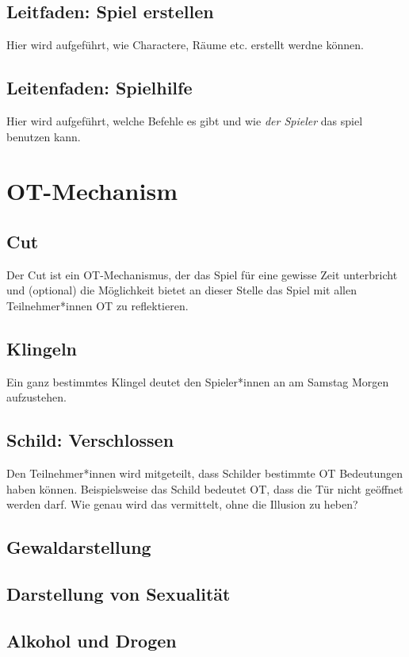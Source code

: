 \documentclass[12pt, a4paper, openany]{report}
\begin{document}
\section{Leitfaden: Spiel erstellen}
Hier wird aufgeführt, wie Charactere, Räume etc. erstellt werdne können.

\section{Leitenfaden: Spielhilfe}
Hier wird aufgeführt, welche Befehle es gibt und wie \textit{der Spieler} das spiel benutzen kann.

\chapter{OT-Mechanism}
\section{Cut} \label{cut}
Der Cut ist ein OT-Mechanismus, der das Spiel für eine gewisse Zeit unterbricht und (optional) die Möglichkeit bietet an dieser Stelle das Spiel mit allen Teilnehmer*innen OT zu reflektieren. 
\section{Klingeln}
Ein ganz bestimmtes Klingel deutet den Spieler*innen an am Samstag Morgen aufzustehen.
\section{Schild: Verschlossen}
Den Teilnehmer*innen wird mitgeteilt, dass Schilder bestimmte OT Bedeutungen haben können. 
Beispielsweise das Schild  bedeutet OT, dass die Tür nicht geöffnet werden darf.
Wie genau wird das vermittelt, ohne die Illusion zu heben? 
\section{Gewaldarstellung}
\section{Darstellung von Sexualität}
\section{Alkohol und Drogen}
\end{document}
